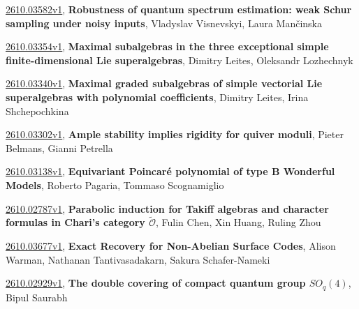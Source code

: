 \documentclass[9pt, a4paper]{article}
\theoremstyle{plain}
\theoremstyle{definition}
\theoremstyle{remark}
\newcommand{\arxiv}[3]{\href{https://arxiv.org/abs/#1}{#1}, \textbf{\textcolor{arxivblue}{#2}}, #3}
\begin{document}
\arxiv{2610.03582v1}{Robustness of quantum spectrum estimation: weak Schur sampling under noisy inputs}{Vladyslav Visnevskyi, Laura Mančinska}

\arxiv{2610.03354v1}{Maximal subalgebras in the three exceptional simple finite-dimensional Lie superalgebras}{Dimitry Leites, Oleksandr Lozhechnyk}

\arxiv{2610.03340v1}{Maximal graded subalgebras of simple vectorial Lie superalgebras with polynomial coefficients}{Dimitry Leites, Irina Shchepochkina}

\arxiv{2610.03302v1}{Ample stability implies rigidity for quiver moduli}{Pieter Belmans, Gianni Petrella}

\arxiv{2610.03138v1}{Equivariant Poincaré polynomial of type B Wonderful Models}{Roberto Pagaria, Tommaso Scognamiglio}

\arxiv{2610.02787v1}{Parabolic induction for Takiff algebras and character formulas in Chari's category $\widetilde{\mathcal{O}}$}{Fulin Chen, Xin Huang, Ruling Zhou}

\arxiv{2610.03677v1}{Exact Recovery for Non-Abelian Surface Codes}{Alison Warman, Nathanan Tantivasadakarn, Sakura Schafer-Nameki}

\arxiv{2610.02929v1}{The double covering of compact quantum group $SO_q(4)$}{Bipul Saurabh}

\end{document}
